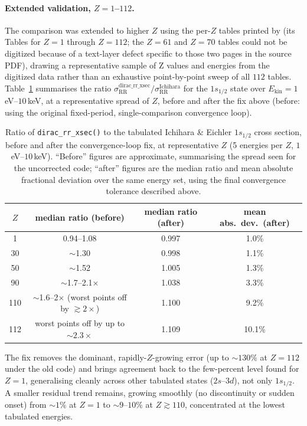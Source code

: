 \documentclass[11pt,a4paper]{article}
\begin{document}
\paragraph{Extended validation, $Z=1$--$112$.} The comparison was
extended to higher $Z$ using the per-$Z$ tables printed by
\cite{Ichihara2000} (its Tables for $Z=1$ through $Z=112$;
the $Z=61$ and $Z=70$ tables could not be digitized because of a
text-layer defect specific to those two pages in the source PDF), drawing
a representative sample of Z values and energies from the digitized data
rather than an exhaustive point-by-point sweep of all $112$ tables.
Table~\ref{tab:ichihara-allz} summarises the ratio
$\sigma_{\mathrm{RR}}^{\mathrm{dirac\_rr\_xsec}}/\sigma_{\mathrm{RR}}^{\mathrm{Ichihara}}$
for the $1s_{1/2}$ state over $E_{\mathrm{kin}}=1$\,eV--$10$\,keV, at a
representative spread of $Z$, before and after the fix above (before:
using the original fixed-period, single-comparison convergence loop).

\begin{table}[h]
\centering
\begin{tabular}{cccc}
\hline
$Z$ & median ratio (before) & median ratio (after) & mean abs.\ dev.\ (after) \\
\hline
1   & 0.94--1.08 & 0.997 & 1.0\% \\
30  & $\sim$1.30 & 0.998 & 1.1\% \\
50  & $\sim$1.52 & 1.005 & 1.3\% \\
90  & $\sim$1.7--2.1$\times$ & 1.038 & 3.3\% \\
110 & $\sim$1.6--2$\times$ (worst points off by $\gtrsim2\times$) & 1.100 & 9.2\% \\
112 & worst points off by up to $\sim2.3\times$ & 1.109 & 10.1\% \\
\hline
\end{tabular}
\caption{Ratio of {\tt dirac\_rr\_xsec()} to the tabulated Ichihara \&
Eichler $1s_{1/2}$ cross section, before and after the convergence-loop
fix, at representative $Z$ (5 energies per $Z$, $1$\,eV--$10$\,keV).
``Before'' figures are approximate, summarising the spread seen for the
uncorrected code; ``after'' figures are the median ratio and mean
absolute fractional deviation over the same energy set, using the final
convergence tolerance described above.}
\label{tab:ichihara-allz}
\end{table}

The fix removes the dominant, rapidly-$Z$-growing error (up to
$\sim130\%$ at $Z=112$ under the old code) and brings agreement back to
the few-percent level found for $Z=1$, generalising cleanly across other
tabulated states ($2s$--$3d$), not only $1s_{1/2}$. A smaller residual
trend remains, growing smoothly (no discontinuity or sudden onset) from
$\sim1\%$ at $Z=1$ to $\sim9$--$10\%$ at $Z\gtrsim110$, concentrated at
the lowest tabulated energies.
\end{document}
